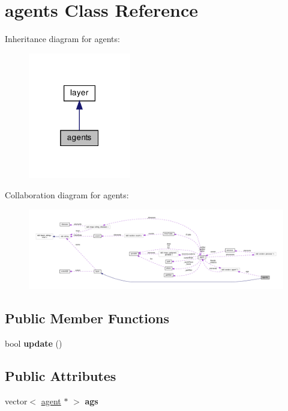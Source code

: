 \hypertarget{classagents}{}\section{agents Class Reference}
\label{classagents}


Inheritance diagram for agents\+:\nopagebreak
\begin{figure}[H]
\begin{center}
\leavevmode
\includegraphics[width=127pt]{classagents__inherit__graph}
\end{center}
\end{figure}


Collaboration diagram for agents\+:\nopagebreak
\begin{figure}[H]
\begin{center}
\leavevmode
\includegraphics[width=350pt]{classagents__coll__graph}
\end{center}
\end{figure}
\subsection*{Public Member Functions}
\begin{DoxyCompactItemize}
\item 
\mbox{\label{classagents_a90630d810c0ced5db4c190ed52720f9d}} 
bool {\bfseries update} ()
\end{DoxyCompactItemize}
\subsection*{Public Attributes}
\begin{DoxyCompactItemize}
\item 
\mbox{\label{classagents_a550d3cd56fd72b1d1e8a454ef1b718fd}} 
vector$<$ \mbox{\hyperlink{classagent}{agent}} $\ast$ $>$ {\bfseries ags}
\end{DoxyCompactItemize}
